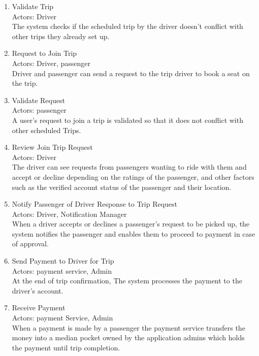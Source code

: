 \documentclass[a4paper, 12pt]{report} %
\begin{document}
\begin{enumerate}
                \item Validate Trip \\
                    Actors: Driver \\
                    The system checks if the scheduled trip by the driver doesn't conflict with other trips they already set up. 
                \item Request to Join Trip \\
                    Actors: Driver, passenger \\
                    Driver and passenger can send a request to the trip driver to book a seat on the trip.
                \item Validate Request \\
                    Actors: passenger \\ 
                    A user’s request to join a trip is validated so that it does not conflict with other scheduled Trips.
                \item Review Join Trip Request \\
                    Actors: Driver \\
                    The driver can see requests from passengers wanting to ride with them and accept or decline depending on the ratings of the passenger, and other factors such as the verified account status of the passenger and their location. 
                \item Notify Passenger of Driver Response to Trip Request\\
                    Actors: Driver, Notification Manager\\
                    When a driver accepts or declines a passenger’s request to be picked up, the system notifies the passenger and enables them to proceed to payment in case of approval.
                \item Send Payment to Driver for Trip\\
                    Actors: payment service, Admin\\
                    At the end of trip confirmation, The system processes the payment to the driver's account.
                \item Receive Payment\\
                    Actors: payment Service, Admin\\
                    When a payment is made by a passenger the payment service transfers the money into a median pocket owned by the application admins which holds the payment until trip completion.

\end{enumerate}
\end{document}
